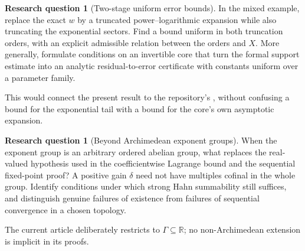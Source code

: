\documentclass[11pt,a4paper]{article}
\theoremstyle{definition}
\newtheorem{question}[theorem]{Research question}
\theoremstyle{remark}
\newcommand{\R}{\mathbb R}
\newcommand{\repoLabel}[1]{\texttt{\detokenize{#1}}}
\begin{document}
\begin{question}[Two-stage uniform error bounds]
In the mixed example, replace the exact $w$ by a truncated power--logarithmic
expansion while also truncating the exponential sectors. Find a bound uniform
in both truncation orders, with an explicit admissible relation between the
orders and $X$. More generally, formulate conditions on an invertible core
that turn the formal support estimate into an analytic residual-to-error
certificate with constants uniform over a parameter family.
\end{question}
This would connect the present result to the repository's
\repoLabel{plt:rmk:ext-open-uniformity}, without confusing a bound for the
exponential tail with a bound for the core's own asymptotic expansion.

\begin{question}[Beyond Archimedean exponent groups]
When the exponent group is an arbitrary ordered abelian group, what replaces
the real-valued hypothesis used in the coefficientwise Lagrange bound and
the sequential fixed-point proof? A positive gain $\delta$ need not have
multiples cofinal in the whole group. Identify conditions under which
strong Hahn summability still suffices, and distinguish genuine failures of
existence from failures of sequential convergence in a chosen topology.
\end{question}
The current article deliberately restricts to $\Gamma\subseteq\R$;
no non-Archimedean extension is implicit in its proofs.
\end{document}
